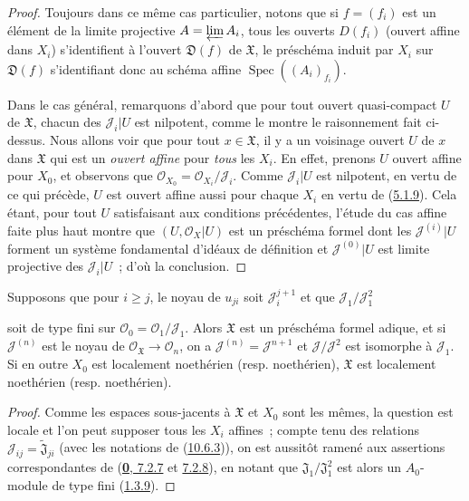 \begin{proof}
Toujours dans ce même cas particulier, notons que si $f=(f_i)$ est un
élément de la limite projective $A=\varprojlim A_i$, tous les ouverts
$D(f_i)$ (ouvert affine dans $X_i$) s'identifient à l'ouvert
$\mathfrak{D}(f)$ de $\mathfrak{X}$, le préschéma induit par $X_i$ sur
$\mathfrak{D}(f)$ s'identifiant donc au schéma affine
$\operatorname{Spec}((A_i)_{f_i})$.

Dans le cas général, remarquons d'abord que pour tout ouvert quasi-compact
$U$ de $\mathfrak{X}$, chacun des $\mathscr{J}_i|U$ est nilpotent, comme
le montre le raisonnement fait ci-dessus. Nous allons voir que pour tout
$x\in\mathfrak{X}$, il y a un voisinage ouvert $U$ de $x$ dans
$\mathfrak{X}$ qui est un \emph{ouvert affine} pour \emph{tous} les $X_i$. En
effet, prenons $U$ ouvert affine pour $X_0$, et observons que
$\mathscr{O}_{X_0}=\mathscr{O}_{X_i}/\mathscr{J}_i$. Comme
$\mathscr{J}_i|U$ est nilpotent, en vertu de ce qui précède, $U$ est
ouvert affine aussi pour chaque $X_i$ en vertu de
(\hyperref[I.5.1.9-fr]{5.1.9}). Cela étant, pour tout $U$ satisfaisant
aux conditions précédentes, l'étude du cas affine faite plus haut montre
que $(U,\mathscr{O}_X|U)$ est un préschéma formel dont les
$\mathscr{J}^{(i)}|U$ forment un système fondamental d'idéaux de
définition et $\mathscr{J}^{(0)}|U$ est limite projective des
$\mathscr{J}_i|U$~; d'où la conclusion.
\end{proof}

\begin{corollary}[10.6.4]
\label{I.10.6.4-fr}
Supposons que pour $i\geq j$, le noyau de $u_{ji}$ soit
$\mathscr{J}_i^{j+1}$ et que $\mathscr{J}_1/\mathscr{J}_1^2$


soit de type fini sur
$\mathscr{O}_0=\mathscr{O}_1/\mathscr{J}_1$. Alors $\mathfrak{X}$ est
un préschéma formel adique, et si $\mathscr{J}^{(n)}$ est le noyau de
$\mathscr{O}_{\mathfrak{X}}\to\mathscr{O}_n$, on a
$\mathscr{J}^{(n)}=\mathscr{J}^{n+1}$ et
$\mathscr{J}/\mathscr{J}^2$ est isomorphe à $\mathscr{J}_1$. Si en
outre $X_0$ est localement noethérien \textup{(resp.} noethérien),
$\mathfrak{X}$ est localement noethérien \textup{(resp.} noethérien).
\end{corollary}

\begin{proof}
Comme les espaces sous-jacents à $\mathfrak{X}$ et $X_0$ sont les mêmes,
la question est locale et l'on peut supposer tous les $X_i$ affines~;
compte tenu des relations
$\mathscr{J}_{ij}=\widetilde{\mathfrak{J}}_{ji}$ (avec les notations
de (\hyperref[I.10.6.3-fr]{10.6.3})), on est aussitôt ramené aux
assertions correspondantes de
(\hyperref[0.7.2.7-fr]{\textbf{0}, 7.2.7} et
\hyperref[0.7.2.8-fr]{7.2.8}), en notant que
$\mathfrak{J}_1/\mathfrak{J}_1^2$ est alors un $A_0$-module de type
fini (\hyperref[I.1.3.9-fr]{1.3.9}).
\end{proof}

